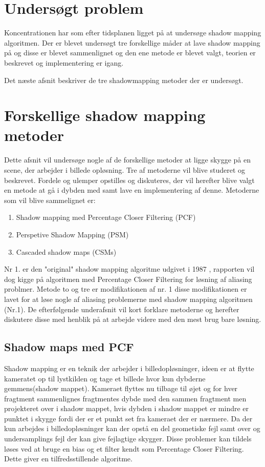 \documentclass[11pt,a4paper]{article}
\begin{document}
\section{Undersøgt problem}

Koncentrationen har som efter tidsplanen ligget på at undersøge shadow mapping algoritmen. Der er blevet undersøgt tre forskellige måder at lave shadow mapping på og disse er blevet sammenlignet og den ene metode er blevet valgt, teorien er beskrevet og implementering er igang. 

Det næste afsnit beskriver de tre shadowmapping metoder der er undersøgt.



\section{Forskellige shadow mapping metoder}

Dette afsnit vil undersøge nogle af de forskellige metoder at ligge skygge på en scene, der arbejder i billede opløsning. Tre af metoderne vil blive studeret og beskrevet. Fordele og ulemper opstilles og diskuteres, der vil herefter blive valgt en metode at gå i dybden med samt lave en implementering af denne. Metoderne som vil blive sammelignet er:

\begin{enumerate}
  \item Shadow mapping med Percentage Closer Filtering (PCF)
  \item Perspetive Shadow Mapping (PSM)
  \item Cascaded shadow maps (CSMs)
\end{enumerate}

Nr 1. er den "original" shadow mapping algoritme udgivet i 1987 \cite{SMAP}, rapporten vil dog kigge på algoritmen med Percentage Closer Filtering for løsning af aliasing problmer. Metode to og tre er modifikationen af nr. 1 disse modifikationen er lavet for at løse nogle af aliasing problemerne med shadow mapping algoritmen (Nr.1). De efterfølgende underafsnit vil kort forklare metoderne og herefter diskutere disse med henblik på at arbejde videre med den mest brug bare løsning.

\subsection{Shadow maps med PCF}

Shadow mapping \cite{SMAP} er en teknik der arbejder i billedopløsninger, ideen er at flytte kameratet op til lystkilden og tage et billede hvor kun dybderne gemmens(shadow mappet). Kameraet flyttes nu tilbage til øjet og for hver fragtment sammenlignes fragtmentes dybde med den sammen fragtment men projekteret over i shadow mappet, hvis dybden i shadow mappet er mindre er punktet i skygge fordi der er et punkt set fra kameraet der er nærmere. Da der kun arbejdes i billedopløsninger kan der opstå en del geometiske fejl samt over og undersamplings fejl der kan give fejlagtige skygger. Disse problemer kan tildels løses ved at bruge en bias og et filter kendt som Percentage Closer Filtering. Dette giver en tilfredsstillende algoritme.
\end{document}
